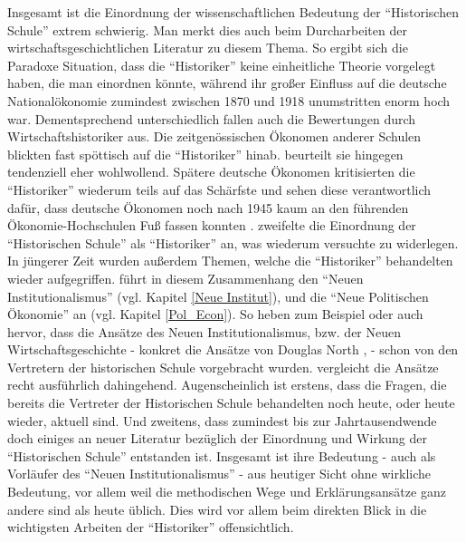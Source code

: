 Insgesamt ist die Einordnung der wissenschaftlichen Bedeutung der "`Historischen Schule"' extrem schwierig. Man merkt dies auch beim Durcharbeiten der wirtschaftsgeschichtlichen Literatur zu diesem Thema. So ergibt sich die Paradoxe Situation, dass die "`Historiker"' keine einheitliche Theorie vorgelegt haben, die man einordnen könnte, während ihr großer Einfluss auf die deutsche Nationalökonomie zumindest zwischen 1870 und 1918 unumstritten enorm hoch war. Dementsprechend unterschiedlich fallen auch die Bewertungen durch Wirtschaftshistoriker aus. Die zeitgenössischen Ökonomen anderer Schulen blickten fast spöttisch auf die "`Historiker"' hinab. \textcite{Schumpeter1954} beurteilt sie hingegen tendenziell eher wohlwollend. Spätere deutsche Ökonomen kritisierten die "`Historiker"' wiederum teils auf das Schärfste und sehen diese verantwortlich dafür, dass deutsche Ökonomen noch nach 1945 kaum an den führenden Ökonomie-Hochschulen Fuß fassen konnten \parencite[S. 115f]{Winkel1989}. \textcite{Pearson1999} zweifelte die Einordnung der "`Historischen Schule"' als "`Historiker"' an, was wiederum \textcite{Caldwell2001} versuchte zu widerlegen. In jüngerer Zeit wurden außerdem Themen, welche die "`Historiker"' behandelten wieder aufgegriffen. \textcite[S. 210]{Rosner2012} führt in diesem Zusammenhang den "`Neuen Institutionalismus"' (vgl. Kapitel \ref{Neue Institut}), und die "`Neue Politischen Ökonomie"' an (vgl. Kapitel \ref{Pol_Econ}). So heben zum Beispiel \textcite{Wischermann1993} oder auch \textcite{Plumpe1999} hervor, dass die Ansätze des Neuen Institutionalismus, bzw. der Neuen Wirtschaftsgeschichte - konkret die Ansätze von Douglas North \parencite[S. 243]{Wischermann1993}, \parencite[S. 257]{Plumpe1999} - schon von den Vertretern der historischen Schule vorgebracht wurden. \textcite{Richter1996} vergleicht die Ansätze recht ausführlich dahingehend. Augenscheinlich ist erstens, dass die Fragen, die bereits die Vertreter der Historischen Schule behandelten noch heute, oder heute wieder, aktuell sind. Und zweitens, dass zumindest bis zur Jahrtausendwende doch einiges an neuer Literatur bezüglich der Einordnung und Wirkung der "`Historischen Schule"' entstanden ist. Insgesamt ist ihre Bedeutung - auch als Vorläufer des "`Neuen Institutionalismus"' - aus heutiger Sicht ohne wirkliche Bedeutung, vor allem weil die methodischen Wege und Erklärungsansätze ganz andere sind als heute üblich. Dies wird vor allem beim direkten Blick in die wichtigsten Arbeiten der "`Historiker"' offensichtlich. 

